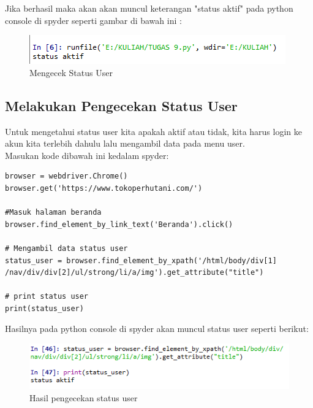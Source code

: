 \newpage
Jika berhasil maka akan akan muncul keterangan "status aktif" pada python console di spyder seperti gambar di bawah ini :
\begin{figure}[h]
	\centering
	\includegraphics[scale=0.8]{figures/status_user_aktif}
	\caption{Mengecek Status User}
\end{figure}

\newpage
\subsection{Melakukan Pengecekan Status User}
Untuk mengetahui status user kita apakah aktif atau tidak, kita harus login ke akun kita terlebih dahulu lalu mengambil data pada menu user.
\\
Masukan kode dibawah ini kedalam spyder:
\begin{verbatim}
browser = webdriver.Chrome()
browser.get('https://www.tokoperhutani.com/')

#Masuk halaman beranda
browser.find_element_by_link_text('Beranda').click()

# Mengambil data status user
status_user = browser.find_element_by_xpath('/html/body/div[1]
/nav/div/div[2]/ul/strong/li/a/img').get_attribute("title")

# print status user
print(status_user)
\end{verbatim}

Hasilnya pada python console di spyder akan muncul status user seperti berikut:
\begin{figure}[h]
	\centering
	\includegraphics[scale=0.7]{figures/T9_SU}
	\caption{Hasil pengecekan status user}
\end{figure}
